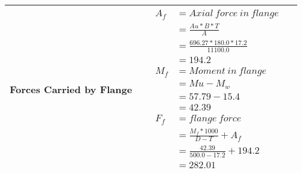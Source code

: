 \documentclass{article}%
\begin{document}
\begin{longtable}{|p{4cm}|p{5cm}|p{5.5cm}|p{1.5cm}|}
\hline%
Forces Carried by Flange&&$\begin{aligned} A_f&= Axial~force~ in ~flange  \\ &= \frac{Au * B *T}{A} \\ &= \frac{696.27 * 180.0*17.2}{11100.0} \\ &=194.2\\ M_f& =Moment~ in~ flange \\  & = Mu-M_w\\ &= 57.79-15.4\\ &=42.39\\  F_f& =flange~force  \\ & = \frac{M_f *1000}{D-T} + A_f \\ &= \frac{42.39}{500.0-17.2} +194.2 \\ &=282.01\end{aligned}$&\\%
\hline%
\end{longtable}

%
\newpage%
\end{document}
